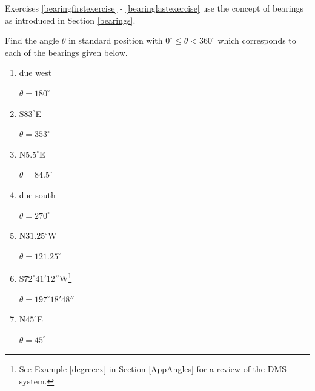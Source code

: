 \documentclass{ximera}
\begin{document}
\begin{question}
Exercises \ref{bearingfirstexercise} - \ref{bearinglastexercise} use the concept of bearings as introduced in Section \ref{bearings}.

\begin{problem}\label{bearingfirstexercise} Find the angle $\theta$ in standard position with $0^{\circ} \leq \theta < 360^{\circ}$ which corresponds to each of the bearings given below.


\begin{enumerate}

\item due west

\begin{solution}
$\theta = 180^{\circ}$
\end{solution}

\item S$83^{\circ}$E

\begin{solution}
$\theta = 353^{\circ}$
\end{solution}

\item N$5.5^{\circ}$E

\begin{solution}
$\theta = 84.5^{\circ}$
\end{solution}

\item due south

\begin{solution}
$\theta = 270^{\circ}$
\end{solution}

\item N$31.25^{\circ}$W

\begin{solution}
$\theta = 121.25^{\circ}$
\end{solution}

\item S$72^{\circ}41'12''$W\footnote{See Example \ref{degreeex} in Section \ref{AppAngles} for a review of the DMS system.}

\begin{solution}
$\theta = 197^{\circ} 18' 48''$
\end{solution}

\item N$45^{\circ}$E

\begin{solution}
$\theta = 45^{\circ}$
\end{solution}


\end{enumerate}
\end{problem}
\end{question}
\end{document}
